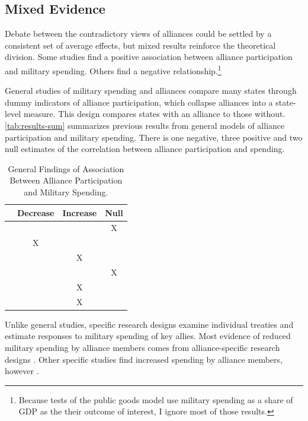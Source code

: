 \documentclass[12pt]{article}
\begin{document}
\subsection{Mixed Evidence} 


Debate between the contradictory views of alliances could be settled by a consistent set of average effects, but mixed results reinforce the theoretical division.
Some studies find a positive association between alliance participation and military spending. 
Others find a negative relationship.\footnote{
Because tests of the public goods model use military spending as a share of GDP as the their outcome of interest, I ignore most of those results.} 


General studies of military spending and alliances compare many states through dummy indicators of alliance participation, which collapse alliances into a state-level measure. 
This design compares states with an alliance to those without.
\autoref{tab:results-sum} summarizes previous results from general models of alliance participation and military spending. 
There is one negative, three positive and two null estimates of the correlation between alliance participation and spending. 


\begin{table}[hbt!]
\begin{center}
\begin{tabular}{lccc}
     & Decrease & Increase & Null \\
\hline
\citet{MostSiverson1987} &  &  & X \\
\citet{Conybeare1994} & X & &  \\
\citet{Diehl1994} &  & X &  \\
\citet{Goldsmith2003} &  &  & X \\
\citet{MorganPalmer2006} &  & X & \\ 
\citet{QuirozFlores2011} &  & X &  \\ 
\hline
\end{tabular}
\caption{General Findings of Association Between Alliance Participation and Military Spending.}
\label{tab:results-sum}
\end{center} 
\end{table}


Unlike general studies, specific research designs examine individual treaties and estimate responses to military spending of key allies. 
Most evidence of reduced military spending by alliance members comes from alliance-specific research designs \citep{BarnettLevy1991, Morrow1993, Sorokin1994, PluemperNeumayer2015, GeorgeSandler2017}.
Other specific studies find increased spending by alliance members, however \citep{ConybeareSandler1990, Chenetal1996}. 
\end{document}
